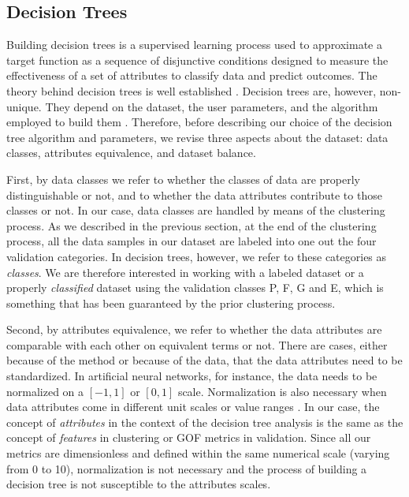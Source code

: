 
\subsection{Decision Trees}
\label{sec:decision-tree}

Building decision trees is a supervised learning process used to approximate a target function as a sequence of disjunctive conditions designed to measure the effectiveness of a set of attributes to classify data and predict outcomes. The theory behind decision trees is well established \citep[e.g.,][]{Quinlan_1986_ML, Quinlan_1993_Book, Mitchell_1997_Book}. Decision trees are, however, non-unique. They depend on the dataset, the user parameters, and the algorithm employed to build them \citep{Murthy_1998_DMKD}. Therefore, before describing our choice of the decision tree algorithm and parameters, we revise three aspects about the dataset: data classes, attributes equivalence, and dataset balance.

First, by data classes we refer to whether the classes of data are properly distinguishable or not, and to whether the data attributes contribute to those classes or not. In our case, data classes are handled by means of the clustering process. As we described in the previous section, at the end of the clustering process, all the data samples in our dataset are labeled into one out the four validation categories. In decision trees, however, we refer to these categories as \textit{classes}. We are therefore interested in working with a labeled dataset or a properly \textit{classified} dataset using the validation classes P, F, G and E, which is something that has been guaranteed by the prior clustering process.

Second, by attributes equivalence, we refer to whether the data attributes are comparable with each other on equivalent terms or not. There are cases, either because of the method or because of the data, that the data attributes need to be standardized. In artificial neural networks, for instance, the data needs to be normalized on a $[-1,1]$ or $[0,1]$ scale. Normalization is also necessary when data attributes come in different unit scales or value ranges \citep[e.g.,][]{Wu_2010_JH}. In our case, the concept of \textit{attributes} in the context of the decision tree analysis is the same as the concept of \textit{features} in clustering or GOF metrics in validation. Since all our metrics are dimensionless and defined within the same numerical scale (varying from 0 to 10), normalization is not necessary and the process of building a decision tree is not susceptible to the attributes scales.

